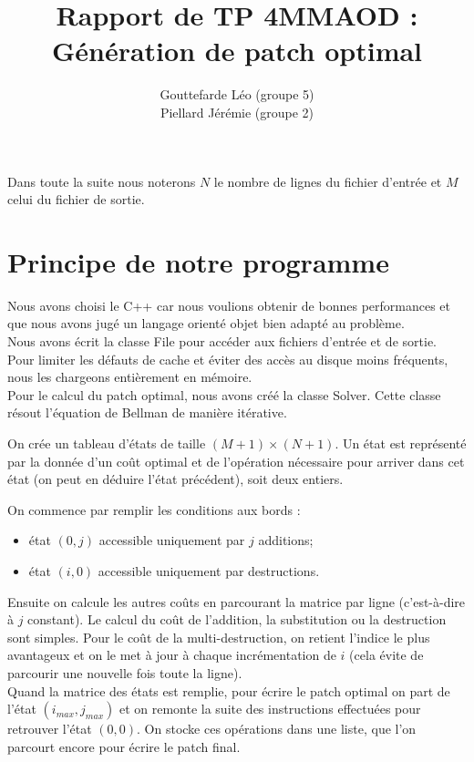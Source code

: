 \documentclass[a4paper, 10pt, french]{article}
\title{Rapport de TP 4MMAOD : Génération de patch optimal}
\author{
{\sc Gouttefarde} Léo (groupe 5)\\
{\sc Piellard} Jérémie (groupe 2)
}
\begin{document}
\maketitle

Dans toute la suite nous noterons $N$ le nombre de lignes du fichier d'entrée et $M$ celui du fichier de sortie.

\section{Principe de notre  programme}
Nous avons choisi le C++ car nous voulions obtenir de bonnes performances
et que nous avons jugé un langage orienté objet bien adapté au problème.\\

Nous avons écrit la classe File pour accéder aux fichiers d'entrée et de sortie. Pour limiter les défauts de cache et éviter des accès au disque moins fréquents, nous les chargeons entièrement en mémoire.\\

Pour le calcul du patch optimal, nous avons créé la classe Solver.
Cette classe résout l'équation de Bellman de manière itérative.

On crée un tableau d'états de taille $(M+1)\times(N+1)$.
Un état est représenté par la donnée d'un coût optimal et de l'opération nécessaire pour arriver dans cet état
(on peut en déduire l'état précédent), soit deux entiers.

On commence par remplir les conditions aux bords :
\begin{itemize}
\item état $(0,j)$ accessible uniquement par $j$ additions;
\item état $(i,0)$ accessible uniquement par destructions.
\end{itemize}

Ensuite on calcule les autres coûts en parcourant la matrice par ligne
(c'est-à-dire à $j$ constant).
Le calcul du coût de l'addition, la substitution ou la destruction sont simples.
Pour le coût de la multi-destruction, on retient l'indice le plus avantageux
et on le met à jour à chaque incrémentation de $i$ (cela évite de parcourir une nouvelle fois toute la ligne).\\

Quand la matrice des états est remplie, pour écrire le patch optimal on part de l'état $(i_{max}, j_{max})$
et on remonte la suite des instructions effectuées pour retrouver l'état $(0,0)$.
On stocke ces opérations dans une liste, que l'on parcourt encore pour écrire le patch final.
\end{document}
